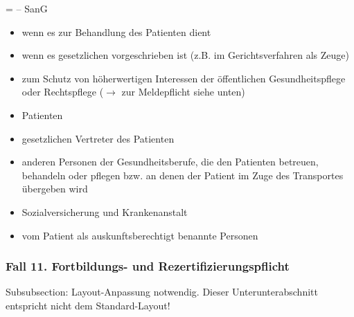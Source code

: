  =   --
 SanG

\begin{itemize}
    \item {\mdseries
    wenn es zur Behandlung des Patienten dient}
    
    \item {\mdseries
    wenn es gesetzlichen vorgeschrieben ist (z.B. im
    Gerichtsverfahren als Zeuge)}
    
    \item zum Schutz von h\"oherwertigen Interessen der \"offentlichen
    Gesundheitspflege oder Rechtspflege (${\rightarrow}$ zur Meldepflicht
    siehe unten)
    
\end{itemize}


\begin{itemize}
    \item {\mdseries
    Patienten}
    
    \item {\mdseries
    gesetzlichen Vertreter des Patienten}
    
    \item {\mdseries
    anderen Personen der Gesundheitsberufe, die den
    Patienten	betreuen, behandeln oder pflegen bzw. an denen der Patient im Zuge des Transportes \"ubergeben wird}
       
       \item {\mdseries
       Sozialversicherung und Krankenanstalt}
       
       \item {\mdseries
       vom Patient als auskunftsberechtigt benannte Personen}
       
\end{itemize}




\subsubsection{Fall 11. Fortbildungs- und Rezertifizierungspflicht}
\begin{anfxwarning}[author=GABS]{Subsubsection: Layout-Anpassung notwendig.}
Dieser Unterunterabschnitt entspricht nicht dem Standard-Layout!
\end{anfxwarning}
\label{jus-fall:fortbildung}

